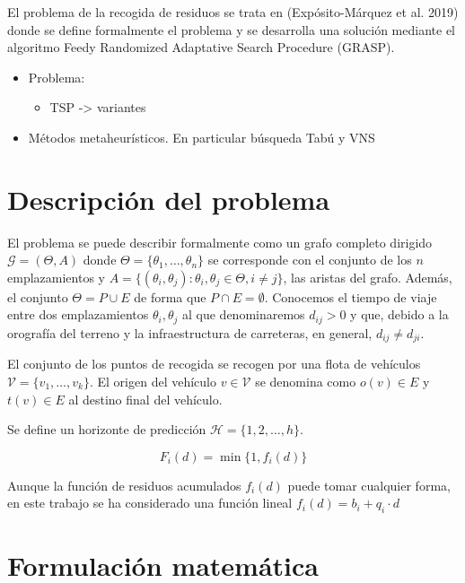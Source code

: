 \documentclass[
]{article}
\providecommand{\tightlist}{%
  \setlength{\itemsep}{0pt}\setlength{\parskip}{0pt}}
\begin{document}
El problema de la recogida de residuos se trata en (Expósito-Márquez et
al. 2019) donde se define formalmente el problema y se desarrolla una
solución mediante el algoritmo Feedy Randomized Adaptative Search
Procedure (GRASP).

\begin{itemize}
\tightlist
\item
  Problema:

  \begin{itemize}
  \tightlist
  \item
    TSP -\textgreater{} variantes
  \end{itemize}
\item
  Métodos metaheurísticos. En particular búsqueda Tabú y VNS
\end{itemize}

\hypertarget{descripciuxf3n-del-problema}{%
\section{Descripción del problema}\label{descripciuxf3n-del-problema}}

El problema se puede describir formalmente como un grafo completo
dirigido \(\mathcal{G} = (\Theta, A)\) donde
\(\Theta=\{\theta_1,\ldots, \theta_n\}\) se corresponde con el conjunto
de los \(n\) emplazamientos y
\(A=\{(\theta_i,\theta_j):\theta_i,\theta_j\in\Theta, i\neq j\}\), las
aristas del grafo. Además, el conjunto \(\Theta = P \cup E\) de forma
que \(P\cap E = \emptyset\). Conocemos el tiempo de viaje entre dos
emplazamientos \(\theta_i, \theta_j\) al que denominaremos \(d_{ij}>0\)
y que, debido a la orografía del terreno y la infraestructura de
carreteras, en general, \(d_{ij}\neq d_{ji}\).

El conjunto de los puntos de recogida se recogen por una flota de
vehículos \(\mathcal{V} = \{v_1,\ldots, v_k\}\). El origen del vehículo
\(v\in\mathcal{V}\) se denomina como \(o(v)\in E\) y \(t(v)\in E\) al
destino final del vehículo.

Se define un horizonte de predicción \(\mathcal{H}=\{1,2,\ldots, h\}\).

\[
F_i(d) = \min\{1, f_i(d)\}
\]

Aunque la función de residuos acumulados \(f_i(d)\) puede tomar
cualquier forma, en este trabajo se ha considerado una función lineal
\(f_i(d) = b_i + q_i\cdot d\)

\hypertarget{formulaciuxf3n-matemuxe1tica}{%
\section{Formulación matemática}\label{formulaciuxf3n-matemuxe1tica}}
\end{document}
